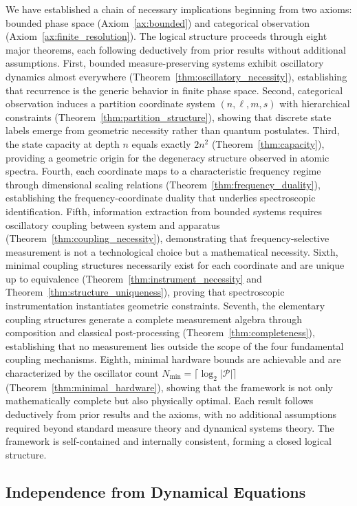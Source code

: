 \documentclass[twocolumn,10pt,a4paper]{article}
\theoremstyle{remark}
\newcommand{\partition}{\mathcal{P}}
\begin{document}
We have established a chain of necessary implications beginning from two axioms: bounded phase space (Axiom~\ref{ax:bounded}) and categorical observation (Axiom~\ref{ax:finite_resolution}). The logical structure proceeds through eight major theorems, each following deductively from prior results without additional assumptions. First, bounded measure-preserving systems exhibit oscillatory dynamics almost everywhere (Theorem~\ref{thm:oscillatory_necessity}), establishing that recurrence is the generic behavior in finite phase space. Second, categorical observation induces a partition coordinate system $(n, \ell, m, s)$ with hierarchical constraints (Theorem~\ref{thm:partition_structure}), showing that discrete state labels emerge from geometric necessity rather than quantum postulates. Third, the state capacity at depth $n$ equals exactly $2n^2$ (Theorem~\ref{thm:capacity}), providing a geometric origin for the degeneracy structure observed in atomic spectra. Fourth, each coordinate maps to a characteristic frequency regime through dimensional scaling relations (Theorem~\ref{thm:frequency_duality}), establishing the frequency-coordinate duality that underlies spectroscopic identification. Fifth, information extraction from bounded systems requires oscillatory coupling between system and apparatus (Theorem~\ref{thm:coupling_necessity}), demonstrating that frequency-selective measurement is not a technological choice but a mathematical necessity. Sixth, minimal coupling structures necessarily exist for each coordinate and are unique up to equivalence (Theorem~\ref{thm:instrument_necessity} and Theorem~\ref{thm:structure_uniqueness}), proving that spectroscopic instrumentation instantiates geometric constraints. Seventh, the elementary coupling structures generate a complete measurement algebra through composition and classical post-processing (Theorem~\ref{thm:completeness}), establishing that no measurement lies outside the scope of the four fundamental coupling mechanisms. Eighth, minimal hardware bounds are achievable and are characterized by the oscillator count $N_{\min} = \lceil \log_2 |\partition| \rceil$ (Theorem~\ref{thm:minimal_hardware}), showing that the framework is not only mathematically complete but also physically optimal. Each result follows deductively from prior results and the axioms, with no additional assumptions required beyond standard measure theory and dynamical systems theory. The framework is self-contained and internally consistent, forming a closed logical structure.

\subsection{Independence from Dynamical Equations}
\end{document}
